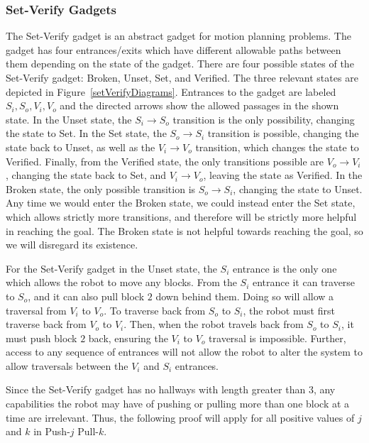 \subsubsection{Set-Verify Gadgets}
\label{sec:SetVerifyGadgets}
The Set-Verify gadget is an abstract gadget for motion planning problems. The gadget has four entrances/exits which have different allowable paths between them depending on the state of the gadget. There are four possible states of the Set-Verify gadget: Broken, Unset, Set, and Verified. The three relevant states are depicted in Figure~\ref{setVerifyDiagrams}. Entrances to the gadget are labeled $S_i, S_o, V_i, V_o$ and the directed arrows show the allowed passages in the shown state. In the Unset state, the $S_i \rightarrow S_o$ transition is the only possibility, changing the state to Set. In the Set state, the $S_o \rightarrow S_i$ transition is possible, changing the state back to Unset, as well as the $V_i \rightarrow V_o$ transition, which changes the state to Verified. Finally, from the Verified state, the only transitions possible are $V_o \rightarrow V_i$, changing the state back to Set, and $V_i \rightarrow V_o$, leaving the state as Verified. In the Broken state, the only possible transition is $S_o \rightarrow S_i$, changing the state to Unset. Any time we would enter the Broken state, we could instead enter the Set state, which allows strictly more transitions, and therefore will be strictly more helpful in reaching the goal. The Broken state is not helpful towards reaching the goal, so we will disregard its existence.

For the Set-Verify gadget in the Unset state, the $S_i$ entrance is the only one which allows the robot to move any blocks. From the $S_i$ entrance it can traverse to $S_o$, and it can also pull block $2$ down behind them. Doing so will allow a traversal from $V_i$ to $V_o$. To traverse back from $S_o$ to $S_i$, the robot must first traverse back from $V_o$ to $V_i$. Then, when the robot travels back from $S_o$ to $S_i$, it must push block $2$ back, ensuring the $V_i$ to $V_o$ traversal is impossible. Further, access to any sequence of entrances will not allow the robot to alter the system to allow traversals between the $V_i$ and $S_i$ entrances. 

Since the Set-Verify gadget has no hallways with length greater than $3$, any capabilities the robot may have of pushing or pulling more than one block at a time are irrelevant. Thus, the following proof will apply for all positive values of $j$ and $k$ in Push-$j$ Pull-$k$.

